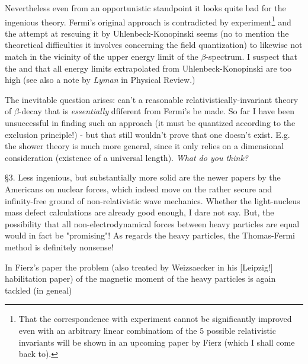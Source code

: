 Nevertheless even from an opportunistic standpoint it looks quite bad for the ingenious theory. Fermi's original approach is contradicted by experiment\footnote{That the correspondence with experiment cannot be significantly improved even with an arbitrary linear combinatiom of the 5 possible relativistic invariants will be shown in an upcoming paper by Fierz (which I shall come back to).} and the attempt at rescuing it by Uhlenbeck-Konopinski seems (no to mention the theoretical difficulties it involves concerning the field quantization) to likewise not match in the vicinity of the upper energy limit of the $\beta$-spectrum. I suspect that the  and that all energy limits extrapolated from Uhlenbeck-Konopinski are too high (see also a note by \textit{Lyman} in Physical Review.)

The inevitable question arises: can't a reasonable relativistically-invariant theory of $\beta$-decay that is \textit{essentially} dfiferent from Fermi's be made. So far I have been unsuccessful in finding such an approach (it must be quantized according to the exclusion principle!) - but that still wouldn't prove that one doesn't exist. E.g. the shower theory is much more general, since it only relies on a dimensional consideration (existence of a universal length). \textit{What do you think?}

§3. Less ingenious, but substantially more solid are the newer papers by the Americans on nuclear forces, which indeed move on the rather secure and infinity-free ground of non-relativistic wave mechanics. Whether the light-nucleus mass defect calculations are already good enough, I dare not say. But, the possibility that all non-electrodynamical forces between heavy particles are equal would in fact be "promising"! As regards the heavy particles, the Thomas-Fermi method is definitely nonsense! 

In Fierz's paper the problem (also treated by Weizsaecker in his [Leipzig!] habilitation paper) of the magnetic moment of the heavy particles is again tackled (in geneal)
\?{}